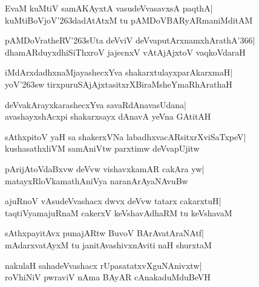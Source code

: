 \documentclass[twoside,12pt,openright]{book}
\def\S{\char'263}
\newcounter{shloka}[chapter]
\begin{document}
\begin{shloka}%
EvaM kuMtiV samAKAyxtA vasudeVvasavxsA paqthA|\\
kuMtiBoVjoV\S dadAtAtxM tu pAMDoVBARyARmaniMditAM
\end{shloka}

\begin{shloka}%
pAMDoVratheRV\S sUta deVviV deVvaputArxnamxhArathA\char'366|\\
dhamARduyxdhiSiThxroV jajecnxV vAtAjAjxtoV vaqkoVdaraH
\end{shloka}

\begin{shloka}%
iMdArxdadhxnaMjayashecxYva shakarxtulayxparAkarxmaH|\\
yoV\S sw tirxpuruSAjAjxtasitxrXBiraMsheYmaRhArathaH
\end{shloka}

\begin{shloka}%
deVvakArayxkarashecxYva savaRdAnavasUdana|\\
avashayxshAcxpi shakarxsayx dAnavA yeVna GAtitAH
\end{shloka}

\begin{shloka}%
sAthxpitoV yaH sa shakerxVNa labadhxvacARsitxrXviSaTxpeV|\\
kushasathxliVM samAniVtw parxtimw deVvapUjitw
\end{shloka}

\begin{shloka}%
pArijAtoVdaBxvw deVvw vishavxkamAR cakAra yw|\\
matayxRloVkamathAniVya naranArAyaNAvuBw
\end{shloka}

\begin{shloka}%
ajuRnoV vAsudeVvashacx dwvx deVvw tatarx cakarxtuH|\\
taqtiVyamajuRnaM cakerxV keVshavAdhaRM tu keVshavaM
\end{shloka}

\begin{shloka}%
sAthxpayitAvx punajARtw BuvoV BArAvatAraNAtf|\\
mAdarxvatAyxM tu janitAvashivxnAviti naH shurxtaM
\end{shloka}

\begin{shloka}%
nakulaH sahadeVvashacx rUpasatatxvXguNAnivxtw|\\
roVhiNiV pwraviV nAma BAyAR cAnakaduMduBeVH
\end{shloka}
\end{document}
